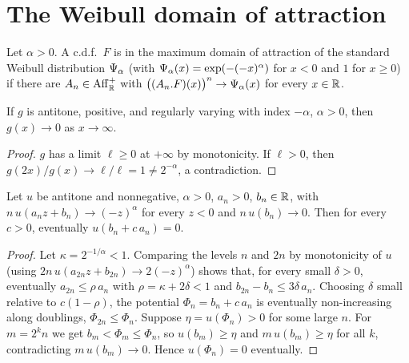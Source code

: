 \section{The Weibull domain of attraction}

\begin{definition}
  \label{def:mda-weibull}
  \leanok
  Let $\alpha > 0$. A c.d.f.\ $F$ is in the maximum domain of attraction of the standard
  Weibull distribution $\Psi_{\alpha}$ (with $\Psi_{\alpha}(x) = \exp(-(-x)^\alpha)$
  for $x < 0$ and $1$ for $x \ge 0$) if there are $A_n \in \mathrm{Aff}^+_{\mathbb{R}}$ with
  $\big( (A_n . F)(x) \big)^n \to \Psi_{\alpha}(x)$ for every $x \in \mathbb{R}$.
\end{definition}

\begin{lemma}
  \label{lem:weibull-tendsto-zero}
  \leanok
  If $g$ is antitone, positive, and regularly varying with index $-\alpha$, $\alpha > 0$,
  then $g(x) \to 0$ as $x \to \infty$.
\end{lemma}
\begin{proof}
  \leanok
  $g$ has a limit $\ell \ge 0$ at $+\infty$ by monotonicity. If $\ell > 0$, then
  $g(2x)/g(x) \to \ell/\ell = 1 \ne 2^{-\alpha}$, a contradiction.
\end{proof}

\begin{lemma}
  \label{lem:weibull-endpoint}
  \leanok
  Let $u$ be antitone and nonnegative, $\alpha > 0$, $a_n > 0$, $b_n \in \mathbb{R}$, with
  $n \, u(a_n z + b_n) \to (-z)^\alpha$ for every $z < 0$ and $n \, u(b_n) \to 0$. Then for
  every $c > 0$, eventually $u(b_n + c \, a_n) = 0$.
\end{lemma}
\begin{proof}
  \leanok
  Let $\kappa = 2^{-1/\alpha} < 1$. Comparing the levels $n$ and $2n$ by monotonicity of $u$
  (using $2n \, u(a_{2n} z + b_{2n}) \to 2(-z)^\alpha$) shows that, for every small $\delta > 0$,
  eventually $a_{2n} \le \rho \, a_n$ with $\rho = \kappa + 2\delta < 1$ and
  $b_{2n} - b_n \le 3 \delta \, a_n$. Choosing $\delta$ small relative to $c (1 - \rho)$, the
  potential $\Phi_n = b_n + c \, a_n$ is eventually non-increasing along doublings,
  $\Phi_{2n} \le \Phi_n$. Suppose $\eta = u(\Phi_n) > 0$ for some large $n$. For $m = 2^k n$ we get
  $b_m < \Phi_m \le \Phi_n$, so $u(b_m) \ge \eta$ and $m \, u(b_m) \ge \eta$ for all $k$,
  contradicting $m \, u(b_m) \to 0$. Hence $u(\Phi_n) = 0$ eventually.
\end{proof}

